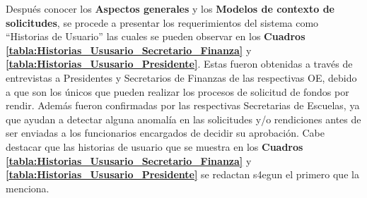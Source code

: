Después conocer los \textbf{Aspectos generales} y los \textbf{Modelos de contexto de solicitudes}, se procede a presentar los requerimientos del sistema como ``Historias de Usuario'' las cuales se pueden observar en los \textbf{Cuadros \ref{tabla:Historias_Ususario_Secretario_Finanza}} y \textbf{\ref{tabla:Historias_Ususario_Presidente}}. Estas fueron obtenidas a través de entrevistas a Presidentes y Secretarios de Finanzas de las respectivas OE, debido a que son los únicos que pueden realizar los procesos de solicitud de fondos por rendir. Además fueron confirmadas por las respectivas Secretarias de Escuelas, ya que ayudan a detectar alguna anomalía en las solicitudes y/o rendiciones antes de ser enviadas a los funcionarios encargados de decidir su aprobación. Cabe destacar que las historias de usuario que se muestra en los \textbf{Cuadros \ref{tabla:Historias_Ususario_Secretario_Finanza}} y \textbf{\ref{tabla:Historias_Ususario_Presidente}} se redactan s4egun el primero que la menciona.

